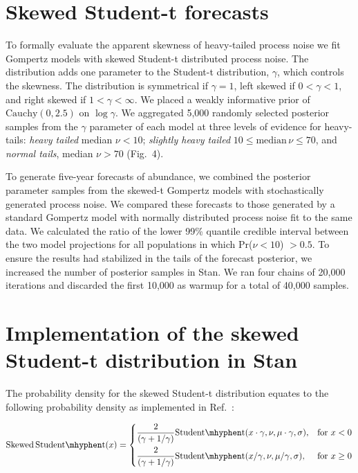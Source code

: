 \documentclass[12pt]{article}
\begin{document}
\section{Skewed Student-t forecasts} To formally evaluate the apparent skewness of heavy-tailed process noise we fit Gompertz models with skewed Student-t distributed process noise\cite{fernandez1998}. The distribution adds one parameter to the Student-t distribution, \(\gamma\), which controls the skewness. The distribution is symmetrical if \(\gamma = 1\), left skewed if \(0 < \gamma < 1\), and right skewed if \(1 < \gamma < \infty\). We placed a weakly informative prior of \(\mathrm{Cauchy}(0, 2.5)\) on \(\log \gamma\). We aggregated 5,000 randomly selected posterior samples from the \(\gamma\) parameter of each model at three levels of evidence for heavy-tails: \emph{heavy tailed} median \(\nu < 10\); \emph{slightly heavy tailed} \(10 \le \mathrm{median}\, \nu \le 70\), and \emph{normal tails}, median \(\nu > 70\) (Fig.~4).

To generate five-year forecasts of abundance, we combined the posterior parameter samples from the skewed-t Gompertz models with stochastically generated process noise. We compared these forecasts to those generated by a standard Gompertz model with normally distributed process noise fit to the same data. We calculated the ratio of the lower 99\% quantile credible interval between the two model projections for all populations in which Pr(\(\nu < 10\)) \(> 0.5\). To ensure the results had stabilized in the tails of the forecast posterior, we increased the number of posterior samples in Stan. We ran four chains of 20,000 iterations and discarded the first 10,000 as warmup for a total of 40,000 samples.

\section{Implementation of the skewed Student-t distribution in Stan}

The probability density for the skewed Student-t distribution \cite{fernandez1998} equates to the following probability density as implemented in Ref.~\cite{king2012}:

\begin{equation}
  \mathrm{Skewed\,Student\mhyphen t}(x) =
\begin{dcases}
\frac{2}{(\gamma + 1/\gamma)}
         \mathrm{Student\mhyphen t}(x \cdot \gamma, \nu, \mu \cdot \gamma, \sigma),& \text{for } x < 0\\
       \frac{2}{(\gamma + 1/\gamma)}
         \mathrm{Student\mhyphen t}(x / \gamma, \nu, \mu / \gamma, \sigma),& \text{for } x \ge 0
\end{dcases}
\end{equation}
\end{document}
